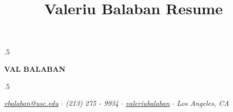 \documentclass[11pt]{article}
\title{Valeriu Balaban Resume}
\begin{document}
\pagecolor{black!5!white}

\thispagestyle{fancy}

\moveleft.5\hoffset\centerline{\textbf{\huge V{\Large AL} B{\Large ALABAN}}}
\vspace{2mm}

\moveleft.5\hoffset\centerline{ \textit{\href{mailto:vbalaban@usc.edu}{vbalaban@usc.edu} \enskip $\cdot$ \enskip (213) 275 - 9934 \enskip $\cdot$ \enskip \href{https://www.linkedin.com/in/valeriubalaban}{{\scriptsize{}} valeriubalaban} \enskip $\cdot$ \enskip Los Angeles, CA }} 

\end{document}
